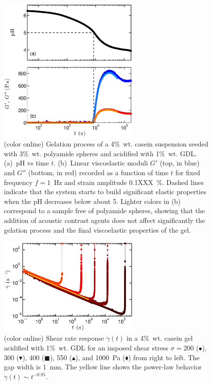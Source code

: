 \documentclass[twocolumn,superscriptaddress,showpacs,preprintnumbers,amsmath,amssymb,prl]{revtex4}
\newcommand\gp{\dot\gamma}
\begin{document}
\begin{figure}[h]
\centering
\includegraphics[width=7cm,clip]{SuppFig1.eps}
\caption{(color online) Gelation process of a 4\%~wt. casein suspension seeded with 3\%~wt. polyamide spheres and acidified with 1\%~wt. GDL. (a)~pH vs time $t$. (b)~Linear viscoelastic moduli $G'$ (top, in blue) and $G''$ (bottom, in red) recorded as a function of time $t$ for fixed frequency $f=1$~Hz and strain amplitude 0.1XXX~\%. Dashed lines indicate that the system starts to build significant elastic properties when the pH decreases below about 5. Lighter colors in (b) correspond to a sample free of polyamide spheres, showing that the addition of acoustic contrast agents does not affect significantly the gelation process and the final viscoelastic properties of the gel.
\label{suppfig1}}
\end{figure} 

\begin{figure}[h]
\centering
\includegraphics[width=7cm,clip]{SuppFig2.eps}
\caption{(color online) Shear rate response $\gp(t)$ in a 4\%~wt. casein gel acidified with 1\%~wt. GDL for an imposed shear stress $\sigma=200$ ($\bullet$), 300 ($\blacktriangledown$), 400 ($\blacksquare$), 550 ($\blacktriangle$), and 1000~Pa ($\blacklozenge$) from right to left. The gap width is 1~mm. The yellow line shows the power-law behavior $\gp(t)\sim t^{-0.85}$.
\label{suppfig2}}
\end{figure} 
\end{document}
